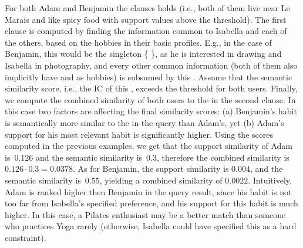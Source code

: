 \begin{example}
	For both Adam and Benjamin the   clauses holds (i.e.,
	both of them live near Le Marais and like spicy food with support
	values above the threshold). The first  clause is
	computed by finding the information common to Isabella and each of
	the others, based on the hobbies in their basic profiles. E.g., in
	the case of Benjamin, this would be the singleton \fset{}
	\{  \}, as he is
	interested in drawing and Isabella in photography, and every other
	common information (both of them also implicitly have
	 and  as hobbies) is subsumed by this
	\fset{}. Assume that the semantic similarity score, i.e., the IC of this
	\fset{}, exceeds the threshold for both users.
	Finally, we compute the combined similarity of both users to the
	\fset{} in the second  clause. In this  case two
	factors are affecting the final similarity scores: (a) Benjamin's
	habit is semantically more similar to the \fset{} in the query than
	Adam's, yet (b) Adam's support for his most relevant habit is
	significantly higher. Using the scores computed in the previous
	examples, we get that the support similarity of Adam is~$0.126$ and
	the semantic similarity is~$0.3$, therefore the combined similarity
	is $0.126\cdot0.3 = 0.0378$. As for Benjamin, the support similarity
	is $0.004$, and the semantic similarity is~$0.55$, yielding a combined similarity of $0.0022$. Intuitively, Adam is ranked higher then
	Benjamin in the query result, since his habit is not too far from
	Isabella's specified preference, and his support for this habit is much
	higher. In this case, a Pilates enthusiast may be a better match than someone who
	practices Yoga rarely (otherwise, Isabella could have specified this
	as a hard constraint).

\end{example}
